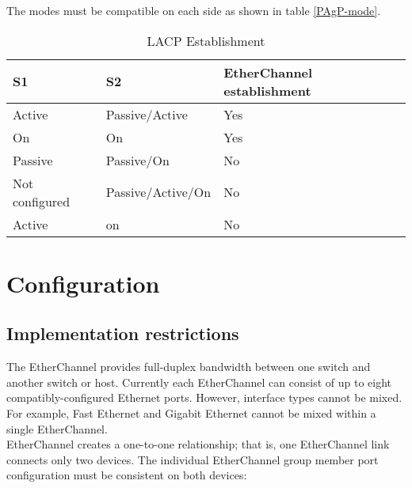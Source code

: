 The modes must be compatible on each side as shown in table \ref{PAgP-mode}.
\begin{table}[htbp]
\caption{LACP Establishment}
\label{LACP-mode}
\begin{tabular}{|l|l|l|}
\hline
S1             & S2                & EtherChannel establishment \\ \hline
Active      & Passive/Active    & Yes                        \\ \hline
On             & On                & Yes                        \\ \hline
Passive           & Passive/On           & No                         \\ \hline
Not configured & Passive/Active/On & No                         \\ \hline
Active      & on                & No                         \\ \hline
\end{tabular}
\end{table}

\section{Configuration}

\subsection{Implementation restrictions}

The EtherChannel provides full-duplex bandwidth between one switch and another switch or host. Currently each EtherChannel can consist of up to eight compatibly-configured Ethernet ports. However, interface types cannot be mixed. For example, Fast Ethernet and Gigabit Ethernet cannot be mixed within a single EtherChannel.\\

EtherChannel creates a one-to-one relationship; that is, one EtherChannel link connects only two devices. The individual EtherChannel group member port configuration must be consistent on both devices: 

